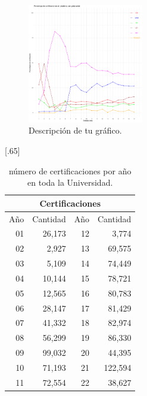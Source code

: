 \documentclass[12pt]{article}
\begin{document}
\begin{figure}[h] %
  \centering
  \includegraphics[width=0.45\textwidth]{grafico.pdf} %
  \caption{Descripción de tu gráfico.}
  \label{fig:grafico} %
\end{figure}

\newpage






\begin{table}[ht]
\centering
\scalebox{0.65}[.65]{
\begin{tabular}{||r||r||r|r||}\hline
\multicolumn{4}{|c|}{Certificaciones} \\\hline
Año  & Cantidad  & Año  & Cantidad  \\\hline
01 & 26,173& 12 & 3,774 \\ 
  02 & 2,927 &13 & 69,575  \\ 
  03 & 5,109 & 14 & 74,449\\ 
  04 & 10,144 & 15 & 78,721\\ 
  05 & 12,565 &16 & 80,783 \\ 
  06 & 28,147 &17 & 81,429\\ 
  07 & 41,332 &18 & 82,974\\ 
  08 & 56,299 &19 & 86,330\\ 
  09 & 99,032 &20 & 44,395\\ 
  10 & 71,193 &21 & 122,594 \\ 
  11 & 72,554 &22 & 38,627\\
\hline
\end{tabular}}
\caption{\label{CertificacionesAnual}n\'umero de certificaciones por a\~no en toda la Universidad.}
\end{table}
\end{document}
